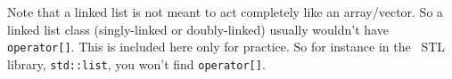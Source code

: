 Note that a linked list is not meant to act completely like an
array/vector.
So a linked list class (singly-linked or doubly-linked)
usually wouldn't have \verb!operator[]!.
This is included here only for practice.
So for instance in the \cpp\ STL library, \verb!std::list!,
you won't find \verb!operator[]!.
